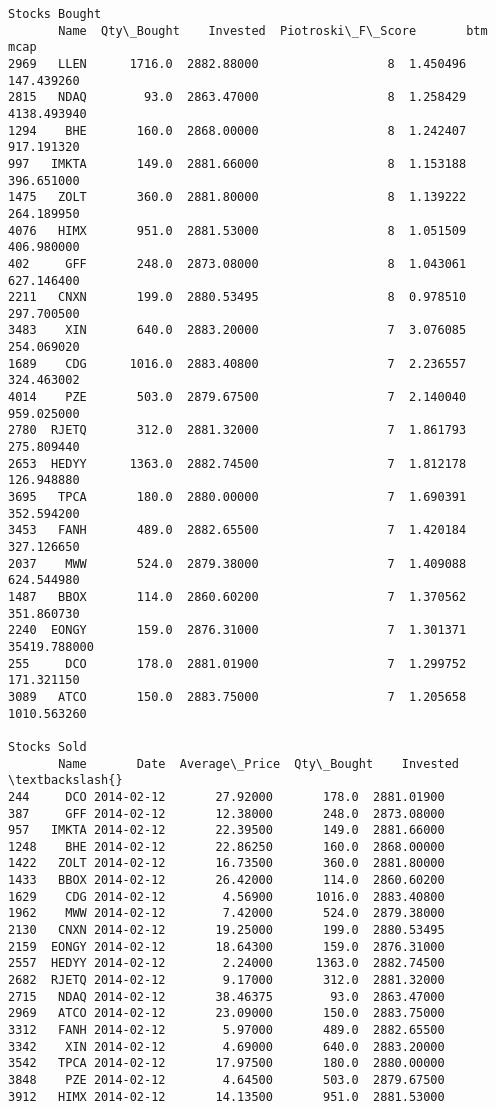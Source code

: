 \documentclass[11pt]{article}
\begin{document}
\begin{Verbatim}[commandchars=\\\{\}]
Stocks Bought
       Name  Qty\_Bought    Invested  Piotroski\_F\_Score       btm          mcap
2969   LLEN      1716.0  2882.88000                  8  1.450496    147.439260
2815   NDAQ        93.0  2863.47000                  8  1.258429   4138.493940
1294    BHE       160.0  2868.00000                  8  1.242407    917.191320
997   IMKTA       149.0  2881.66000                  8  1.153188    396.651000
1475   ZOLT       360.0  2881.80000                  8  1.139222    264.189950
4076   HIMX       951.0  2881.53000                  8  1.051509    406.980000
402     GFF       248.0  2873.08000                  8  1.043061    627.146400
2211   CNXN       199.0  2880.53495                  8  0.978510    297.700500
3483    XIN       640.0  2883.20000                  7  3.076085    254.069020
1689    CDG      1016.0  2883.40800                  7  2.236557    324.463002
4014    PZE       503.0  2879.67500                  7  2.140040    959.025000
2780  RJETQ       312.0  2881.32000                  7  1.861793    275.809440
2653  HEDYY      1363.0  2882.74500                  7  1.812178    126.948880
3695   TPCA       180.0  2880.00000                  7  1.690391    352.594200
3453   FANH       489.0  2882.65500                  7  1.420184    327.126650
2037    MWW       524.0  2879.38000                  7  1.409088    624.544980
1487   BBOX       114.0  2860.60200                  7  1.370562    351.860730
2240  EONGY       159.0  2876.31000                  7  1.301371  35419.788000
255     DCO       178.0  2881.01900                  7  1.299752    171.321150
3089   ATCO       150.0  2883.75000                  7  1.205658   1010.563260

Stocks Sold
       Name       Date  Average\_Price  Qty\_Bought    Invested  \textbackslash{}
244     DCO 2014-02-12       27.92000       178.0  2881.01900
387     GFF 2014-02-12       12.38000       248.0  2873.08000
957   IMKTA 2014-02-12       22.39500       149.0  2881.66000
1248    BHE 2014-02-12       22.86250       160.0  2868.00000
1422   ZOLT 2014-02-12       16.73500       360.0  2881.80000
1433   BBOX 2014-02-12       26.42000       114.0  2860.60200
1629    CDG 2014-02-12        4.56900      1016.0  2883.40800
1962    MWW 2014-02-12        7.42000       524.0  2879.38000
2130   CNXN 2014-02-12       19.25000       199.0  2880.53495
2159  EONGY 2014-02-12       18.64300       159.0  2876.31000
2557  HEDYY 2014-02-12        2.24000      1363.0  2882.74500
2682  RJETQ 2014-02-12        9.17000       312.0  2881.32000
2715   NDAQ 2014-02-12       38.46375        93.0  2863.47000
2969   ATCO 2014-02-12       23.09000       150.0  2883.75000
3312   FANH 2014-02-12        5.97000       489.0  2882.65500
3342    XIN 2014-02-12        4.69000       640.0  2883.20000
3542   TPCA 2014-02-12       17.97500       180.0  2880.00000
3848    PZE 2014-02-12        4.64500       503.0  2879.67500
3912   HIMX 2014-02-12       14.13500       951.0  2881.53000


\end{Verbatim}
\end{document}
